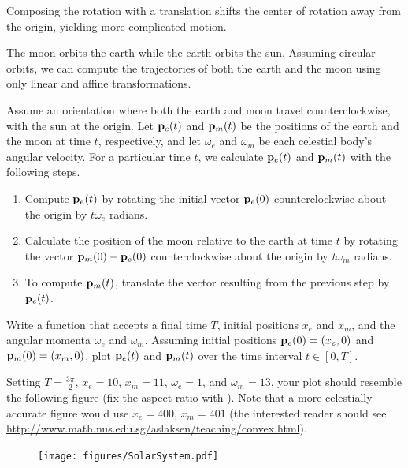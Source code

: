 Composing the rotation with a translation shifts the center of rotation away from the origin, yielding more complicated motion.

\begin{problem} %
The moon orbits the earth while the earth orbits the sun.
Assuming circular orbits, we can compute the trajectories of both the earth and the moon using only linear and affine transformations.

Assume an orientation where both the earth and moon travel counterclockwise, with the sun at the origin.
Let $\mathbf{p}_e(t)$ and $\mathbf{p}_m(t)$ be the positions of the earth and the moon at time $t$, respectively, and let $\omega_e$ and $\omega_m$ be each celestial body's angular velocity.
For a particular time $t$, we calculate $\mathbf{p}_e(t)$ and $\mathbf{p}_m(t)$ with the following steps.
\begin{enumerate}
\item Compute $\mathbf{p}_e(t)$ by rotating the initial vector $\mathbf{p}_e(0)$ counterclockwise about the origin by $t\omega_e$ radians.
\item Calculate the position of the moon relative to the earth at time $t$ by rotating the vector $\mathbf{p}_m(0) - \mathbf{p}_e(0)$ counterclockwise about the origin by $t\omega_m$ radians.
\item To compute $\mathbf{p}_m(t)$, translate the vector resulting from the previous step by $\mathbf{p}_e(t)$.
\end{enumerate}

Write a function that accepts a final time $T$, initial positions $x_e$ and $x_m$, and the angular momenta $\omega_e$ and $\omega_m$.
Assuming initial positions $\mathbf{p}_e(0) = (x_e,0)$ and $\mathbf{p}_m(0) = (x_m,0)$, plot $\mathbf{p}_e(t)$ and $\mathbf{p}_m(t)$ over the time interval $t \in [0, T]$.

Setting $T = \frac{3\pi}{2}$, $x_e=10$, $x_m=11$, $\omega_e = 1$, and $\omega_m = 13$, your plot should resemble the following figure (fix the aspect ratio with ).
Note that a more celestially accurate figure would use $x_e=400$, $x_m=401$ (the interested reader should see \url{http://www.math.nus.edu.sg/aslaksen/teaching/convex.html}).

\begin{figure}[H]
    \texttt{[image: figures/SolarSystem.pdf]}
\end{figure}

\label{prob:solar-system-trajectories}
\end{problem}

